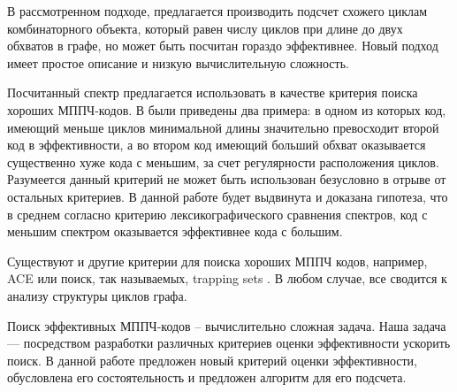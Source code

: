 В рассмотренном подходе, предлагается производить подсчет схожего циклам комбинаторного объекта,
который равен числу циклов при длине до двух обхватов в графе, но может быть посчитан гораздо эффективнее.
Новый подход имеет простое описание и низкую вычислительную сложность.

Посчитанный спектр предлагается использовать в качестве критерия поиска хороших МППЧ-кодов.
В \cite{algorithm-for-counting-for-counting-short-cycles-in-bipartite-graphs} были приведены два примера:
в одном из которых код, имеющий меньше циклов минимальной длины значительно превосходит второй код в
эффективности, а во
втором код имеющий больший обхват оказывается существенно хуже кода с меньшим, за счет регулярности
расположения циклов. Разумеется данный критерий не может быть использован безусловно
в отрыве от остальных критериев. В данной работе будет выдвинута и доказана гипотеза, что в среднем согласно
критерию лексикографического сравнения спектров, код с меньшим спектром оказывается эффективнее кода с большим.

Существуют и другие критерии для поиска хороших МППЧ кодов, например, ACE \cite{ace} или 
поиск, так называемых, trapping sets \cite{trapping-sets}. 
В любом случае, все сводится к анализу структуры циклов графа. 


Поиск эффективных МППЧ-кодов -- вычислительно сложная задача.
Наша задача --- посредством разработки различных критериев оценки эффективности ускорить поиск. 
В данной работе предложен новый критерий оценки эффективности, обусловлена его состоятельность и предложен
алгоритм для его подсчета.









































